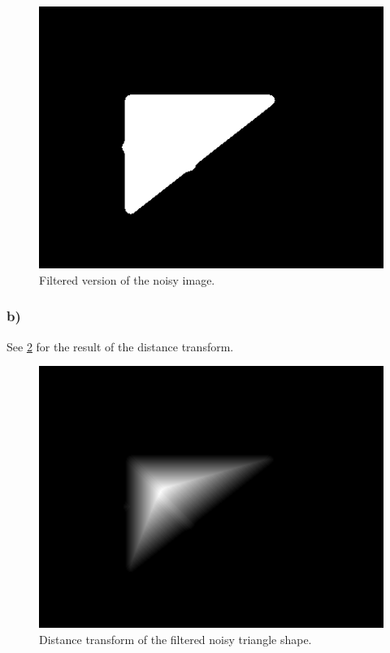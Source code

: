 \begin{figure}[]
    \centering
    \includegraphics[width=1.00\textwidth]{figures/image_processed/noisy-filtered.png}
    \caption{Filtered version of the noisy image. }
    \label{fig:noisy_filtered}
\end{figure}


\subsubsection*{b)}
See \cref{fig:noisy_distance} for the result of the distance transform. 

\begin{figure}[]
    \centering
    \includegraphics[width=1.00\textwidth]{figures/image_processed/noisy-distance.png}
    \caption{Distance transform of the filtered noisy triangle shape. }
    \label{fig:noisy_distance}
\end{figure}

